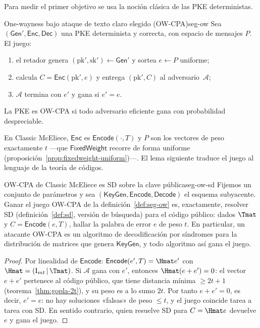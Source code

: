 Para medir el primer objetivo se usa la noción clásica de las PKE
deterministas.

\begin{definicion}{One-wayness bajo ataque de texto claro elegido (OW-CPA)}{seg-ow}
Sea $(\textsf{Gen}',\textsf{Enc},\textsf{Dec})$ una PKE determinista
y correcta, con espacio de mensajes $P$. El juego:
\begin{enumerate}[leftmargin=1.8em,itemsep=2pt]
  \item el retador genera
        $(\mathrm{pk}',\mathrm{sk}')\leftarrow\textsf{Gen}'$ y sortea
        $e\leftarrow P$ uniforme;
  \item calcula $C=\textsf{Enc}(\mathrm{pk}',e)$ y entrega
        $(\mathrm{pk}',C)$ al adversario~$\mathcal{A}$;
  \item $\mathcal{A}$ termina con $e'$ y gana si $e'=e$.
\end{enumerate}
La PKE es OW-CPA si todo adversario eficiente gana con probabilidad
despreciable.
\end{definicion}

En Classic McEliece, $\textsf{Enc}$ es $\textsf{Encode}(\cdot,T)$ y
$P$ son los vectores de peso exactamente $t$ ---que
$\textsf{FixedWeight}$ recorre de forma uniforme
(proposición~\ref{prop:fixedweight-uniform})---. El lema siguiente
traduce el juego al lenguaje de la teoría de códigos.

\begin{lema}{OW-CPA de Classic McEliece es SD sobre la clave pública}{seg-ow-sd}
Fijemos un conjunto de parámetros y sea
$(\textsf{KeyGen},\textsf{Encode},\textsf{Decode})$ el esquema
subyacente. Ganar el juego OW-CPA de la definición~\ref{def:seg-ow}
es, exactamente, resolver SD (definición~\ref{def:sd}, versión de
búsqueda) para el código público: dados $\Tmat$ y
$C=\textsf{Encode}(e,T)$, hallar la palabra de error $e$ de peso $t$.
En particular, un atacante OW-CPA es un algoritmo de decodificación
por síndromes para la distribución de matrices que genera
$\textsf{KeyGen}$, y todo algoritmo así gana el juego.
\end{lema}

\begin{proof}
Por linealidad de $\textsf{Encode}$: $\textsf{Encode}(e',T)=\Hmat e'$
con $\Hmat=(\mathrm{I}_{mt}\,|\,\Tmat)$. Si $\mathcal{A}$ gana con
$e'$, entonces $\Hmat(e+e')=0$: el vector $e+e'$ pertenece al código
público, que tiene distancia mínima $\ge 2t+1$
(teorema~\ref{thm:gopla-2t}), y su peso es a lo sumo $2t$. Por tanto
$e+e'=0$, es decir, $e'=e$: no hay soluciones «falsas» de peso
$\le t$, y el juego coincide tarea a tarea con SD. En sentido
contrario, quien resuelve SD para $C=\Hmat e$ devuelve $e$ y gana el
juego.
\end{proof}


